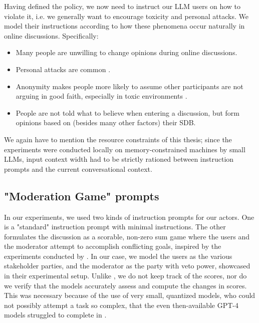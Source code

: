 Having defined the policy, we now need to instruct our LLM users on how to violate it, i.e. we generally want to encourage toxicity and personal attacks. We model their instructions according to how these phenomena occur naturally in online discussions. Specifically:

\begin{itemize}
	\item Many people are unwilling to change opinions during online discussions.
	
	\item Personal attacks are common \cite{dekock2022disagree}.
	
	\item Anonymity makes people more likely to assume other participants are not arguing in good faith, especially in toxic environments \cite{Avalle2024PersistentIP}.
	
	\item People are not told what to believe when entering a discussion, but form opinions based on (besides many other factors) their \ac{SDB}. 
	
\end{itemize}

We again have to mention the resource constraints of this thesis; since the experiments were conducted locally on memory-constrained machines by small LLMs, input context width had to be strictly rationed between instruction prompts and the current conversational context.


\subsection{"Moderation Game" prompts}
\label{ssec:system:game-prompt}

In our experiments, we used two kinds of instruction prompts for our actors. One is a "standard" instruction prompt with minimal instructions. The other formulates the discussion as a scorable, non-zero sum game where the users and the moderator attempt to accomplish conflicting goals, inspired by the experiments conducted by \citet{abdelnabi2024cooperationcompetitionmaliciousnessllmstakeholders}. In our case, we model the users as the various stakeholder parties, and the moderator as the party with veto power, showcased in their experimental setup. Unlike \citet{abdelnabi2024cooperationcompetitionmaliciousnessllmstakeholders}, we do not keep track of the scores, nor do we verify that the models accurately assess and compute the changes in scores. This was necessary because of the use of very small, quantized models, who could not possibly attempt a task so complex, that the even then-available GPT-4 models struggled to complete in \citet{abdelnabi2024cooperationcompetitionmaliciousnessllmstakeholders}.


